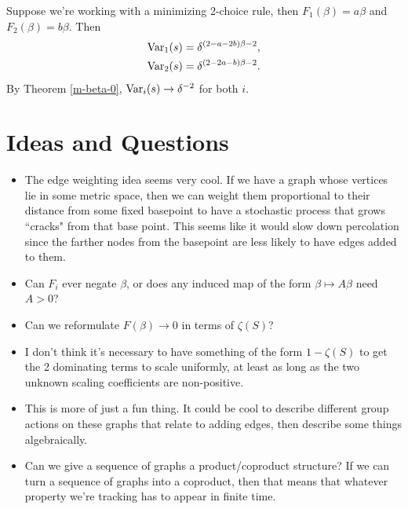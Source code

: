 \documentclass[twoside,10pt]{article}
\begin{document}
\begin{ex}[]
	Suppose we're working with a minimizing 2-choice rule, then $F_1(\beta) = a \beta$ and $F_2(\beta)=b \beta$. Then
	\begin{align*}
		\operatorname{Var}_1(s) &= \delta^{(2-a-2b)\beta-2},\\
		\operatorname{Var}_2(s) &= \delta^{(2-2a-b)\beta-2}.
	\end{align*}
	By Theorem \ref{m-beta-0}, $\operatorname{Var}_i(s) \to \delta^{-2}$ for both $i$. 
\end{ex}


\section{Ideas and Questions}

\begin{itemize}
	\item The edge weighting idea seems very cool. If we have a graph whose vertices lie in some metric space, then we can weight them proportional to their distance from some fixed basepoint to have a stochastic process that grows ``cracks" from that base point. This seems like it would slow down percolation since the farther nodes from the basepoint are less likely to have edges added to them.
	\item Can $F_i$ ever negate $\beta$, or does any induced map of the form $\beta \mapsto A \beta$ need $A > 0$?
	\item Can we reformulate $F(\beta)\to 0$ in terms of $\zeta(S)$?
	\item I don't think it's necessary to have something of the form $1-\zeta(S)$ to get the 2 dominating terms to scale uniformly, at least as long as the two unknown scaling coefficients are non-positive.
	\item This is more of just a fun thing. It could be cool to describe different group actions on these graphs that relate to adding edges, then describe some things algebraically.
	\item Can we give a sequence of graphs a product/coproduct structure? If we can turn a sequence of graphs into a coproduct, then that means that whatever property we're tracking has to appear in finite time.
\end{itemize}
\end{document}
